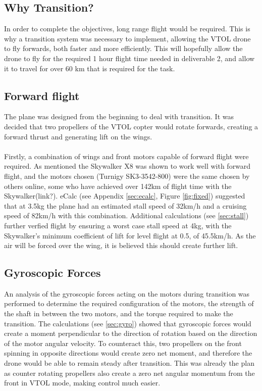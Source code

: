 

\subsection{Why Transition?}
In order to complete the objectives, long range flight would be required. This is why a transition system was necessary to implement, allowing the VTOL drone to fly forwards, both faster and more efficiently. This will hopefully allow the drone to fly for the required 1 hour flight time needed in deliverable 2, and allow it to travel for over 60 km that is required for the task. 

\subsection{Forward flight}
The plane was designed from the beginning to deal with transition. It was decided that two propellers of the VTOL copter would rotate forwards, creating a forward thrust and generating lift on the wings.  
\\\\
Firstly, a combination of wings and front motors capable of forward flight were required.  As mentioned the Skywalker X8 was shown to work well with forward flight, and the motors chosen (Turnigy SK3-3542-800) were the same chosen by others online, some who have achieved over 142km of flight time with the Skywalker(link?). eCalc (see Appendix \ref{sec:ecalc}, Figure \ref{fig:fixed}) suggested that at 3.5kg the plane had an estimated stall speed of 32km/h and a cruising speed of 82km/h with this combination. Additional calculations (see \ref{sec:stall}) further verfied flight by ensuring a worst case stall speed at 4kg, with the Skywalker's minimum coefficient of lift for level flight at 0.5, of 45.5km/h. As the air will be forced over the wing, it is believed this should create further lift.

\subsection{Gyroscopic Forces}
An analysis of the gyroscopic forces acting on the motors during transition was performed to determine the required configuration of the motors, the strength of the shaft in between the two motors, and the torque required to make the transition. The calculations (see  \ref{sec:gyro}) showed that gyroscopic forces would create a moment perpendicular to the direction of rotation based on the direction of the motor angular velocity. To counteract this, two propellers on the front spinning in opposite directions would create zero net moment, and therefore the drone would be able to remain steady after transition. This was already the plan as counter rotating propellers also create a zero net angular momentum from the front in VTOL mode, making control much easier.\\

